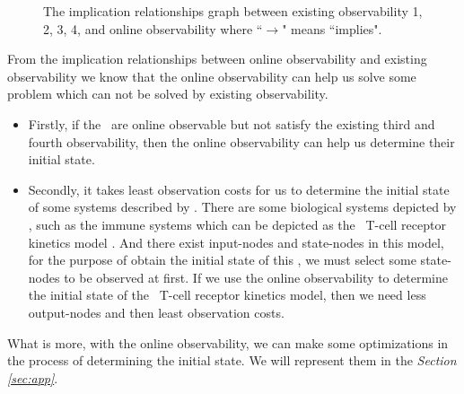 \begin{figure}[thpb]
      \centering
      
      \caption{The implication relationships graph between existing observability 1, 2, 3, 4, and online observability where ``$\rightarrow$" means ``implies".}
      \label{fig:7}
   \end{figure}

From the implication relationships between online observability and existing observability we know that the online observability can help us solve some problem which can not be solved by existing observability. 
 \begin{itemize}
 \item Firstly, if the \BCNs\ are online observable but not satisfy the existing third and fourth observability, then the online observability can help us determine their initial state. 
 \item Secondly, it takes least observation costs for us to determine the initial state of some systems described by \BCNs. There are some biological systems depicted by \BCNs, such as the immune systems which can be depicted as the \BCN\ T-cell receptor kinetics model \cite{Klamt2006A}. And there exist input-nodes and state-nodes in this model, for the purpose of obtain the initial state of this \BCN, we must select some state-nodes to be observed at first. If we use the online observability to determine the initial state of the \BCN\ T-cell receptor kinetics model, then we need less output-nodes and then least observation costs.
 \end{itemize}

What is more, with the online observability, we can make some optimizations in the process of determining the initial state. We will represent them in the {\em Section \ref{sec:app}}.
   
   
